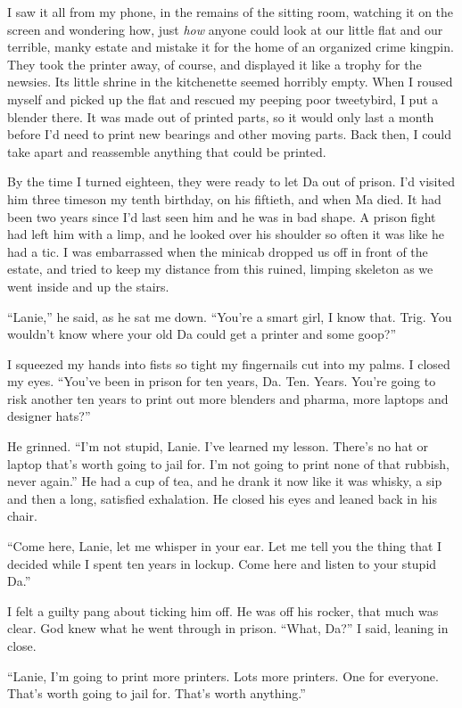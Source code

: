 I saw it all from my phone, in the remains of the sitting room,
watching it on the screen and wondering how, just \emph{how} anyone
could look at our little flat and our terrible, manky estate and
mistake it for the home of an organized crime kingpin. They took
the printer away, of course, and displayed it like a trophy for the
newsies. Its little shrine in the kitchenette seemed horribly
empty. When I roused myself and picked up the flat and rescued my
peeping poor tweetybird, I put a blender there. It was made out of
printed parts, so it would only last a month before I’d need to
print new bearings and other moving parts. Back then, I could take
apart and reassemble anything that could be printed.

By the time I turned eighteen, they were ready to let Da out of
prison. I’d visited him three times\dash{}on my tenth birthday, on his
fiftieth, and when Ma died. It had been two years since I’d last
seen him and he was in bad shape. A prison fight had left him with
a limp, and he looked over his shoulder so often it was like he had
a tic. I was embarrassed when the minicab dropped us off in front
of the estate, and tried to keep my distance from this ruined,
limping skeleton as we went inside and up the stairs.

“Lanie,” he said, as he sat me down. “You’re a smart girl, I know
that. Trig. You wouldn’t know where your old Da could get a printer
and some goop?”

I squeezed my hands into fists so tight my fingernails cut into my
palms. I closed my eyes. “You’ve been in prison for ten years, Da.
Ten. Years. You’re going to risk another ten years to print out
more blenders and pharma, more laptops and designer hats?”

He grinned. “I’m not stupid, Lanie. I’ve learned my lesson. There’s
no hat or laptop that’s worth going to jail for. I’m not going to
print none of that rubbish, never again.” He had a cup of tea, and
he drank it now like it was whisky, a sip and then a long,
satisfied exhalation. He closed his eyes and leaned back in his
chair.

“Come here, Lanie, let me whisper in your ear. Let me tell you the
thing that I decided while I spent ten years in lockup. Come here
and listen to your stupid Da.”

I felt a guilty pang about ticking him off. He was off his rocker,
that much was clear. God knew what he went through in prison.
“What, Da?” I said, leaning in close.

“Lanie, I’m going to print more printers. Lots more printers. One
for everyone. That’s worth going to jail for. That’s worth
anything.”

